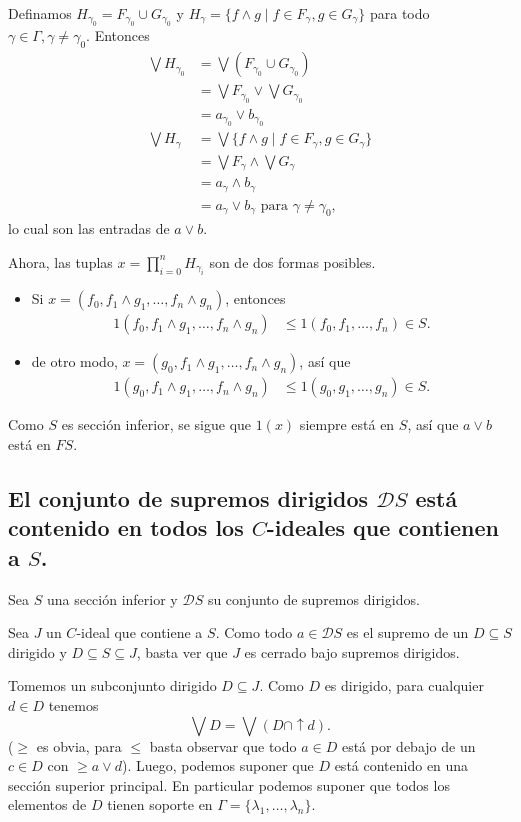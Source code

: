 \documentclass[12pt,letterpaper,titlepage]{article}
\theoremstyle{definition}
\renewcommand\sup{\vee}
\newcommand\Sup{\bigvee}
\renewcommand\inf{\wedge}
\newcommand\D{\mathcal D}
\newcommand\tps[1]{\texorpdfstring{#1}{}}
\newcommand\<{\langle}
\renewcommand\>{\rangle}
\begin{document}
Definamos $H_{\gamma_0}=F_{\gamma_0}\cup G_{\gamma_0}$ y
$H_\gamma = \{f\inf g\mid f\in F_\gamma,g\in G_\gamma\}$ para
todo $\gamma\in\Gamma,\gamma\neq\gamma_0$.
Entonces
\begin{align*}
  \Sup H_{\gamma_0}
  &= \Sup(F_{\gamma_0}\cup G_{\gamma_0}) \\
  &= \Sup F_{\gamma_0} \sup \Sup G_{\gamma_0} \\
  &= a_{\gamma_0} \sup b_{\gamma_0}
  \\
  \Sup H_\gamma
  &= \Sup\{f\inf g \mid f\in F_\gamma, g\in G_\gamma\} \\
  &= \Sup F_\gamma \inf \Sup G_\gamma \\
  &= a_\gamma \inf b_\gamma \\
  &= a_\gamma\sup b_\gamma
  \text{ para } \gamma\neq\gamma_0,
\end{align*}
lo cual son las entradas de $a\sup b$.

Ahora, las tuplas $x=\prod_{i=0}^n H_{\gamma_i}$ son de
dos formas posibles.
\begin{itemize}
  \item Si $x=(f_0,f_1\inf g_1,\dots,f_n\inf g_n)$,
  entonces
  \begin{align*}
    1(f_0,f_1\inf g_1,\dots,f_n\inf g_n)
    &\leq 1(f_0,f_1,\dots,f_n) \in S.
  \end{align*}
  \item de otro modo, $x=(g_0,f_1\inf g_1,\dots,f_n\inf g_n)$,
  así que
  \begin{align*}
    1(g_0,f_1\inf g_1,\dots,f_n\inf g_n)
    &\leq 1(g_0,g_1,\dots,g_n)\in S.
  \end{align*}
\end{itemize}
Como $S$ es sección inferior, se sigue que $1(x)$ siempre está en
$S$, así que $a\sup b$ está en $FS$.

\subsection{El conjunto de supremos dirigidos \tps{$\D S$} está contenido en todos los \tps{$C$}-ideales que contienen a \tps{$S$}.}

Sea $S$ una sección inferior y $\D S$ su conjunto de supremos
dirigidos.

Sea $J$ un $C$-ideal que contiene a $S$.
Como todo $a\in\D S$ es el supremo de un $D\subseteq S$ dirigido
y $D\subseteq S\subseteq J$, basta ver que $J$ es cerrado bajo
supremos dirigidos.

Tomemos un subconjunto dirigido $D\subseteq J$.
Como $D$ es dirigido, para cualquier $d\in D$ tenemos
\[
  \Sup D = \Sup(D\cap{\uparrow}d)
.\]
($\geq$ es obvia, para $\leq$ basta observar que todo $a\in D$
está por debajo de un $c\in D$ con $\geq a\sup d$).
Luego, podemos suponer que $D$ está contenido en una sección
superior principal.
En particular podemos suponer que todos los elementos de $D$
tienen soporte en $\Gamma=\{\lambda_1,\dots,\lambda_n\}$.
\end{document}
